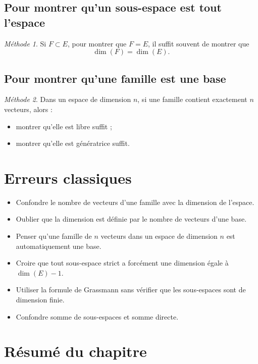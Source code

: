 \documentclass[11pt,a4paper]{article}
\theoremstyle{remark}
\newtheorem*{methode}{Méthode}
\begin{document}
\subsection{Pour montrer qu’un sous-espace est tout l’espace}

\begin{methode}
Si \(F\subset E\), pour montrer que \(F=E\), il suffit souvent de montrer que
\[
\dim(F)=\dim(E).
\]
\end{methode}

\subsection{Pour montrer qu’une famille est une base}

\begin{methode}
Dans un espace de dimension \(n\), si une famille contient exactement \(n\) vecteurs, alors :
\begin{itemize}
    \item montrer qu’elle est libre suffit ;
    \item montrer qu’elle est génératrice suffit.
\end{itemize}
\end{methode}

\section{Erreurs classiques}

\begin{itemize}
    \item Confondre le nombre de vecteurs d’une famille avec la dimension de l’espace.
    \item Oublier que la dimension est définie par le nombre de vecteurs d’une base.
    \item Penser qu’une famille de \(n\) vecteurs dans un espace de dimension \(n\) est automatiquement une base.
    \item Croire que tout sous-espace strict a forcément une dimension égale à \(\dim(E)-1\).
    \item Utiliser la formule de Grassmann sans vérifier que les sous-espaces sont de dimension finie.
    \item Confondre somme de sous-espaces et somme directe.
\end{itemize}

\section{Résumé du chapitre}
\end{document}
